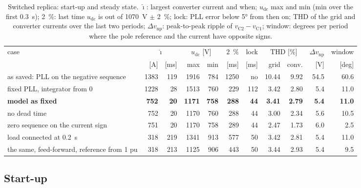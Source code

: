 \documentclass[11pt,a4paper]{scrartcl}
\newcommand{\ped}[1]{_{\mathrm{#1}}}
\begin{document}
\begin{onehalfspace}
\begin{table}[htbp]
	\centering
	\caption{Switched replica: start-up and steady state. $\hat\imath$: largest converter current and when; $u\ped{dc}$ max and min (min over the first \SI{0.3}{\second}); 2~\%: last time $u\ped{dc}$ is out of \SI{1070}{\volt} $\pm$ 2~\%; lock: PLL error below \ang{5} from then on; THD of the grid and converter currents over the last two periods; $\Delta v\ped{np}$: peak-to-peak ripple of $v\ped{C2} - v\ped{C1}$; window: degrees per period where the pole reference and the current have opposite signs.}
	\label{tab:cases}
	\footnotesize
	\setlength{\tabcolsep}{3.3pt}
	\begin{tabular}{@{} l r r r r r r r r r r @{}}
		\toprule
		case & \multicolumn{2}{c}{$\hat\imath$} & \multicolumn{2}{c}{$u\ped{dc}$ [V]} & 2~\% & lock & \multicolumn{2}{c}{THD [\%]} & $\Delta v\ped{np}$ & window \\
		 & [A] & [ms] & max & min & [ms] & [ms] & grid & conv. & [V] & [deg] \\
		\midrule
		as saved: PLL on the negative sequence & 1383 & 119 & 1916 & 784 & 1250 & no & 10.44 & 9.92 & 54.5 & 60.6 \\
		fixed PLL, integrator from 0 & 1228 & 28 & 1513 & 760 & 229 & 112 & 3.42 & 2.80 & 5.4 & 11.0 \\
		\textbf{model as fixed} & \textbf{752} & \textbf{20} & \textbf{1171} & \textbf{758} & \textbf{288} & \textbf{44} & \textbf{3.41} & \textbf{2.79} & \textbf{5.4} & \textbf{11.0} \\
		\quad no dead time & 752 & 20 & 1170 & 760 & 288 & 44 & 3.00 & 2.34 & 5.6 & 10.5 \\
		\quad zero sequence on the current sign & 751 & 20 & 1170 & 758 & 289 & 44 & 2.47 & 1.73 & 6.0 & 2.5 \\
		\quad load connected at \SI{0.2}{\second} & 318 & 219 & 1341 & 913 & 577 & 50 & 3.42 & 2.81 & 5.4 & 11.0 \\
		\quad the same, feed-forward, reference from 1 pu & 318 & 213 & 1125 & 906 & 443 & 50 & 3.44 & 2.93 & 5.4 & 9.5 \\
		\bottomrule
	\end{tabular}
\end{table}

\subsection{Start-up}
\label{sec:startup}


\end{onehalfspace}
\end{document}
